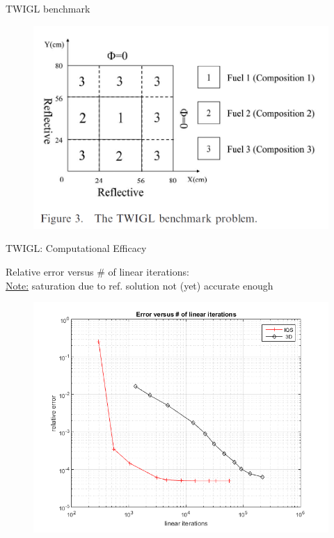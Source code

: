 \documentclass[8pt]{beamer}
\begin{document}
\begin{frame}{TWIGL benchmark}

\begin{figure}[h]
\includegraphics[width=\linewidth]{figures/twigl_geom.png}
\end{figure}

\end{frame}

\begin{frame}{TWIGL:  Computational Efficacy}

Relative error versus \# of linear iterations: \\
\footnotesize{\underline{Note:} saturation due to ref. solution not (yet) accurate enough}

\begin{figure}[h]
\includegraphics[width=0.88\linewidth]{figures/twigl_convergence_iqs.png}
\end{figure}

\end{frame}
\end{document}
